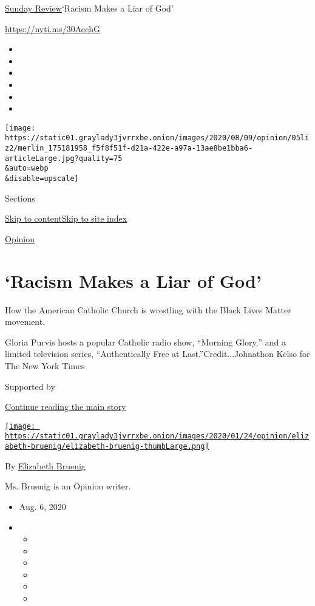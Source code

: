 \href{/section/opinion/sunday}{Sunday Review}\textbar{}`Racism Makes a
Liar of God'

\url{https://nyti.ms/30AeehG}

\begin{itemize}
\item
\item
\item
\item
\item
\item
\end{itemize}

\texttt{[image: https://static01.graylady3jvrrxbe.onion/images/2020/08/09/opinion/05liz2/merlin\_175181958\_f5f8f51f-d21a-422e-a97a-13ae8be1bba6-articleLarge.jpg?quality=75\\\&auto=webp\\\&disable=upscale]}

Sections

\protect\hyperlink{site-content}{Skip to
content}\protect\hyperlink{site-index}{Skip to site index}

\href{/section/opinion}{Opinion}

\hypertarget{racism-makes-a-liar-of-god}{%
\section{`Racism Makes a Liar of
God'}\label{racism-makes-a-liar-of-god}}

How the American Catholic Church is wrestling with the Black Lives
Matter movement.

Gloria Purvis hosts a popular Catholic radio show, ``Morning Glory,''
and a limited television series, ``Authentically Free at
Last.''Credit...Johnathon Kelso for The New York Times

Supported by

\protect\hyperlink{after-sponsor}{Continue reading the main story}

\href{https://www.nytimes3xbfgragh.onion/by/elizabeth-bruenig}{\texttt{[image: https://static01.graylady3jvrrxbe.onion/images/2020/01/24/opinion/elizabeth-bruenig/elizabeth-bruenig-thumbLarge.png]}}

By
\href{https://www.nytimes3xbfgragh.onion/by/elizabeth-bruenig}{Elizabeth
Bruenig}

Ms. Bruenig is an Opinion writer.

\begin{itemize}
\item
  Aug. 6, 2020
\item
  \begin{itemize}
  \item
  \item
  \item
  \item
  \item
  \item
  \end{itemize}
\end{itemize}

